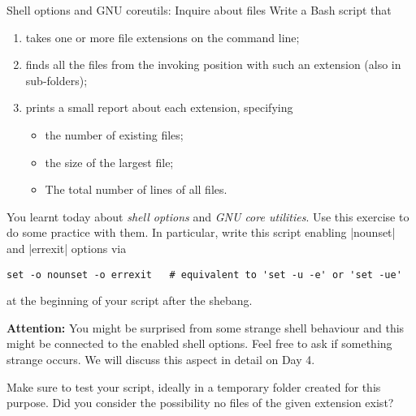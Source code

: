 
\begin{exercise}[Inspirational]{Shell options and GNU coreutils: Inquire about files}
    Write a Bash script that
    \begin{enumerate}
        \item takes one or more file extensions on the command line;
        \item finds all the files from the invoking position with such an extension (also in sub-folders);
        \item prints a small report about each extension, specifying
              \begin{itemize}
                  \item the number of existing files;
                  \item the size of the largest file;
                  \item The total number of lines of all files.
              \end{itemize}
    \end{enumerate}

    You learnt today about \emph{shell options} and \emph{GNU core utilities}.
    Use this exercise to do some practice with them.
    In particular, write this script enabling \bash|nounset| and \bash|errexit| options via
    \begin{lstlisting}[style=myBash]
        set -o nounset -o errexit   # equivalent to 'set -u -e' or 'set -ue'
    \end{lstlisting}
    at the beginning of your script after the shebang.

    \textbf{Attention:} You might be surprised from some strange shell behaviour and this might be connected to the enabled shell options.
    Feel free to ask if something strange occurs.
    We will discuss this aspect in detail on Day 4.

    Make sure to test your script, ideally in a temporary folder created for this purpose.
    Did you consider the possibility no files of the given extension exist?
\end{exercise}
